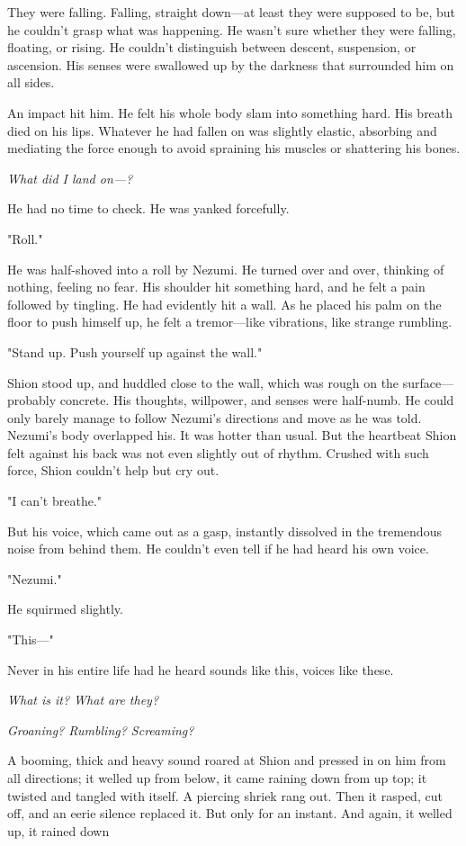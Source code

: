 They were falling. Falling, straight down---at least they were supposed to
be, but he couldn't grasp what was happening. He wasn't sure whether
they were falling, floating, or rising. He couldn't distinguish between
descent, suspension, or ascension. His senses were swallowed up by the
darkness that surrounded him on all sides.

An impact hit him. He felt his whole body slam into something hard. His
breath died on his lips. Whatever he had fallen on was slightly elastic,
absorbing and mediating the force enough to avoid spraining his muscles
or shattering his bones.

\emph{What did I land on---?}

He had no time to check. He was yanked forcefully.

"Roll."

He was half-shoved into a roll by Nezumi. He turned over and over,
thinking of nothing, feeling no fear. His shoulder hit something hard,
and he felt a pain followed by tingling. He had evidently hit a wall. As
he placed his palm on the floor to push himself up, he felt a
tremor---like vibrations, like strange rumbling.

"Stand up. Push yourself up against the wall."

Shion stood up, and huddled close to the wall, which was rough on the
surface---probably concrete. His thoughts, willpower, and senses were
half-numb. He could only barely manage to follow Nezumi's directions and
move as he was told. Nezumi's body overlapped his. It was hotter than
usual. But the heartbeat Shion felt against his back was not even
slightly out of rhythm. Crushed with such force, Shion couldn't help but
cry out.

"I can't breathe."

But his voice, which came out as a gasp, instantly dissolved in the
tremendous noise from behind them. He couldn't even tell if he had heard
his own voice.

"Nezumi."

He squirmed slightly.

"This---"

Never in his entire life had he heard sounds like this, voices like
these.

\emph{What is it? What are they?}

\emph{Groaning? Rumbling? Screaming?}

A booming, thick and heavy sound roared at Shion and pressed in on him
from all directions; it welled up from below, it came raining down from
up top; it twisted and tangled with itself. A piercing shriek rang out.
Then it rasped, cut off, and an eerie silence replaced it. But only for
an instant. And again, it welled up, it rained down\el 

